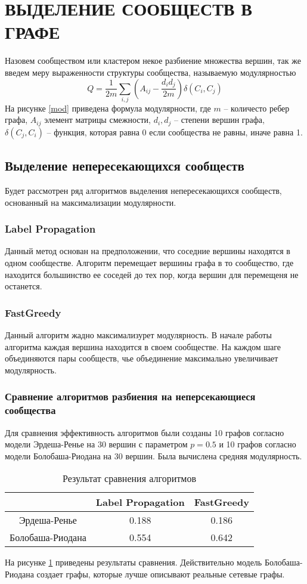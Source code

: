 \section{ВЫДЕЛЕНИЕ СООБЩЕСТВ В ГРАФЕ}
Назовем сообществом или кластером
некое разбиение множества вершин,
так же введем меру выраженности структуры сообщества,
называемую модулярностью \cite{cluster}
\begin{equation}
Q = \frac{1}{2m} \sum_{i,j} (A_{ij} - \frac{d_{i} d_{j}}{2m}) \delta(C_{i},C_{j})
\label{mod}
\end{equation} 
На рисунке \ref{mod} приведена формула модулярности,
где $m$ -- количесто ребер графа,  $A_{ij}$ элемент матрицы смежности,
$d_{i},d_{j}$ -- степени вершин графа, $\delta(C_j,C_i)$
-- функция, которая равна 0 если сообщества не равны, иначе равна 1.
\subsection{Выделение непересекающихся сообществ}
Будет рассмотрен ряд алгоритмов выделения непересекающихся сообществ,
основанный на максимализации модулярности.
\subsubsection{Label Propagation}
Данный метод основан на предположении, 
что соседние вершины находятся в одном
сообществе. Алгоритм перемещает вершины графа в то сообщество,
где находится большинство ее соседей до тех пор, когда 
вершин для перемещеня не останется.
\subsubsection{FastGreedy}
Данный алгоритм жадно максимализурет модулярность.
В начале работы алгоритма каждая вершина находится в своем сообществе.
На каждом шаге объединяются пары сообществ, чье объединение максимально
увеличивает модулярность.
\subsubsection{Сравнение алгоритмов разбиения
на неперсекающиеся сообщества}
Для сравнения эффективность алгоритмов
были созданы 10 графов согласно модели Эрдеша-Ренье на 30
вершин с параметром $p=0.5$ и 10 графов согласно модели Болобаша-Риодана
на 30 вершин. Была вычислена средняя модулярность.
\begin{table}[H]
    \caption{Результат сравнения алгоритмов}
    \label{rnd_test}
    \begin{tabular}{|c|c|c|}
        \hline
        & Label Propagation & FastGreedy\\
        \hline
        Эрдеша-Ренье & 0.188 & 0.186  \\ 
        \hline 
        Болобаша-Риодана & 0.554 & 0.642 \\ 
        \hline
    \end{tabular}
\end{table}
На рисунке \ref{rnd_test} приведены результаты сравнения.
Действительно модель Болобаша-Риодана 
создает графы, которые лучше описывают реальные сетевые графы.
